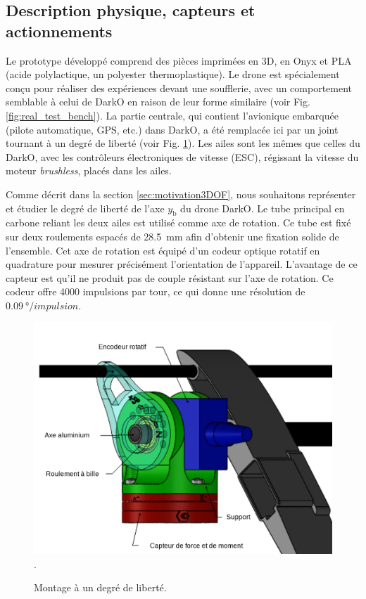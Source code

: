 \subsection{Description physique, capteurs et actionnements}
Le prototype développé comprend des pièces imprimées en 3D, en Onyx et PLA   (acide polylactique, un polyester thermoplastique). Le drone est spécialement conçu pour réaliser des expériences devant une soufflerie, avec un comportement semblable à celui de DarkO en raison de leur forme similaire (voir Fig. \ref{fig:real_test_bench}). La partie centrale, qui contient l'avionique embarquée (pilote automatique, GPS, etc.) dans DarkO, a été remplacée ici par un joint tournant à un degré de liberté (voir Fig. \ref{fig:rotation}). Les ailes sont les mêmes que celles du DarkO, avec les contrôleurs électroniques de vitesse (ESC), régissant la vitesse du moteur \textit{brushless}, placés dans les ailes.

Comme décrit dans la section \ref{sec:motivation3DOF}, nous souhaitons représenter et étudier le degré de liberté de l'axe $y_{\text{b}}$ du drone DarkO. Le tube principal en carbone reliant les deux ailes est utilisé comme axe de rotation. Ce tube est fixé sur deux roulements espacés de \SI{28.5}{\milli\meter} afin d'obtenir une fixation solide de l'ensemble. Cet axe de rotation est équipé d'un codeur optique rotatif en quadrature pour mesurer précisément l'orientation de l'appareil. L'avantage de ce capteur est qu'il ne produit pas de couple résistant sur l'axe de rotation. Ce codeur offre 4000 impulsions par tour, ce qui donne une résolution de $\SI{0.09}{\degree}/impulsion$.
\begin{figure}[!ht]
    \centering
    \includegraphics[width=0.6\columnwidth]{figures/MontageSupport2.png}.
    \caption{Montage à un degré de liberté.}
    \label{fig:rotation}
\end{figure} 

